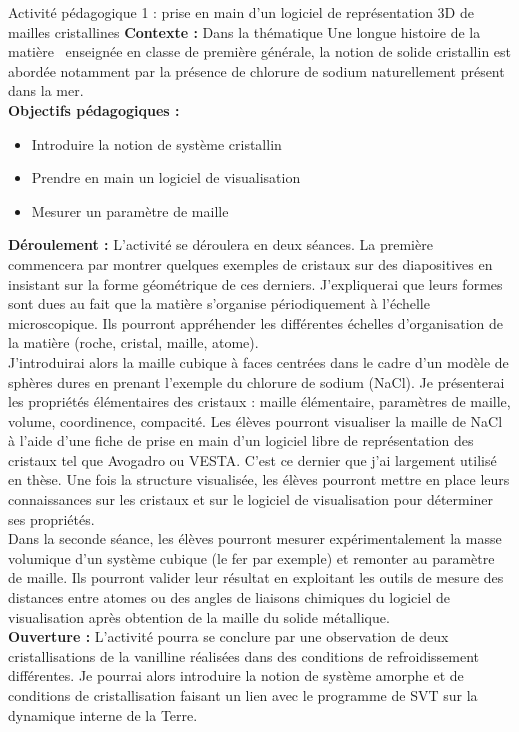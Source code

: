 \begin{highlightBlock}{Activité pédagogique 1 : prise en main d'un logiciel de représentation 3D de mailles cristallines}
\textbf{Contexte :} Dans la thématique \og Une longue histoire de la matière \fg ~enseignée en classe de première générale, la notion de solide cristallin est abordée notamment par la présence de chlorure de sodium naturellement présent dans la mer.\\

\textbf{Objectifs pédagogiques :} \begin{itemize}
 \item Introduire la notion de système cristallin
 \item Prendre en main un logiciel de visualisation
 \item Mesurer un paramètre de maille
\end{itemize}   
\textbf{Déroulement : }L'activité se déroulera en deux séances.
La première commencera par montrer quelques exemples de cristaux sur des diapositives en insistant sur la forme géométrique de ces derniers. J'expliquerai que leurs formes sont dues au fait que la matière s'organise périodiquement à l'échelle microscopique.
Ils pourront appréhender les différentes échelles d'organisation de la matière (roche, cristal, maille, atome).\\
J'introduirai alors la maille cubique à faces centrées dans le cadre d'un modèle de sphères dures en prenant l'exemple du chlorure de sodium (NaCl). Je présenterai les propriétés élémentaires des cristaux : maille élémentaire, paramètres de maille, volume, coordinence, compacité. Les élèves pourront visualiser la maille de NaCl à l'aide d'une fiche de prise en main d'un logiciel libre de représentation des cristaux tel que Avogadro ou VESTA. C'est ce dernier que j'ai largement utilisé en thèse. Une fois la structure visualisée, les élèves pourront mettre en place leurs connaissances sur les cristaux et sur le logiciel de visualisation pour déterminer ses propriétés. \\
Dans la seconde séance, les élèves pourront mesurer expérimentalement la masse volumique d'un système cubique (le fer par exemple) et remonter au paramètre de maille. Ils pourront valider leur résultat en exploitant les outils de mesure des distances entre atomes ou des angles de liaisons chimiques du logiciel de visualisation après obtention de la maille du solide métallique.\\ 
\textbf{Ouverture :} L'activité pourra se conclure par une observation de deux cristallisations de la vanilline réalisées dans des conditions de refroidissement différentes. Je pourrai alors introduire la notion de système amorphe et de conditions de cristallisation faisant un lien avec le programme de SVT sur la dynamique interne de la Terre.
\end{highlightBlock}



